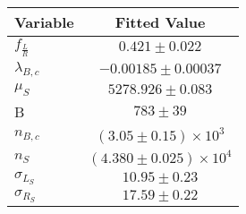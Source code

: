 \begin{tabular}[t]{lc}
\hline
Variable &Fitted Value\\
\hline\hline
$f_{\frac{L}{R}}$&$0.421\pm0.022$\\
\hline
$\lambda_{B,c}$&$-0.00185\pm0.00037$\\
\hline
$\mu_S$&$5278.926\pm0.083$\\
\hline
B&$783\pm39$\\
\hline
$n_{B,c}$&$(3.05\pm0.15)\times 10^3$\\
\hline
$n_S$&$(4.380\pm0.025)\times 10^4$\\
\hline
$\sigma_{L_S}$&$10.95\pm0.23$\\
\hline
$\sigma_{R_S}$&$17.59\pm0.22$\\
\hline
\end{tabular}